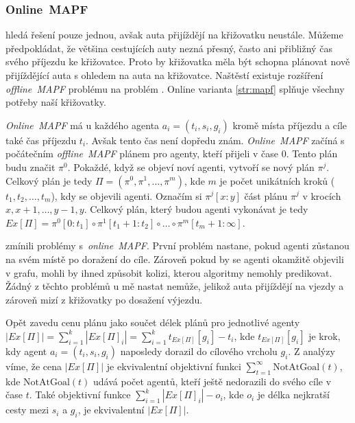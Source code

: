 \subsubsection{Online~MAPF}\label{subsubsec:online_mapf}

%

 hledá řešení pouze jednou, avšak auta přijíždějí na křižovatku neustále.
Můžeme předpokládat, že většina cestujících auty nezná přesný, často ani přibližný čas svého příjezdu ke křižovatce.
Proto by křižovatka měla být schopna plánovat nově přijíždějící auta s ohledem na auta na křižovatce.
Naštěstí existuje rozšíření \emph{offline~MAPF} problému na problém  \citet*{Svancara}.
Online varianta \ref{str:mapf} splňuje všechny potřeby naší křižovatky.

\emph{Online~MAPF} má u každého agenta $a_i = (t_i, s_i, g_i)$ kromě místa příjezdu a cíle také čas příjezdu $t_i$.
Avšak tento čas není dopředu znám.
\emph{Online~MAPF} začíná s počátečním \emph{offline~MAPF} plánem pro agenty, kteří přijeli v čase $0$.
Tento plán budu značit $\pi^0$.
Pokaždé, když se objeví noví agenti, vytvoří se nový plán $\pi^j$.
Celkový plán je tedy $\Pi = (\pi^0, \pi^1, \dots, \pi^m)$, kde $m$ je počet unikátních kroků ($t_1, t_2, \dots, t_m$), kdy se objevili agenti.
Označím si $\pi^j[x:y]$ část plánu $\pi^j$ v krocích $x, x + 1, \dots, y - 1, y$.
Celkový plán, který budou agenti vykonávat je tedy $Ex[\Pi] = \pi^0[0:t_1] \circ \pi^1[t_1 + 1:t_2] \circ \dots \circ \pi^m[t_m + 1:\infty]$.

\citet{Svancara} zmínili problémy s~\emph{online~MAPF}.
První problém nastane, pokud agenti zůstanou na svém místě po doražení do cíle.
Zároveň pokud by se agenti okamžitě objevili v grafu, mohli by ihned způsobit kolizi, kterou algoritmy nemohly predikovat.
Žádný z těchto problémů u mě nastat nemůže, jelikož auta přijíždějí na vjezdy
a zároveň mizí z křižovatky po dosažení výjezdu.

Opět zavedu cenu plánu jako součet délek plánů pro jednotlivé agenty $|Ex[\Pi]| = \sum_{i=1}^{k} |Ex[\Pi]_i| = \sum_{i=1}^{k} t_{Ex[\Pi]}[g_i] - t_i$,
kde $t_{Ex[\Pi]}[g_i]$ je krok, kdy agent $a_i = (t_i, s_i, g_i)$ naposledy dorazil do cílového vrcholu $g_i$.
Z analýzy \citet{Svancara} víme, že cena $|Ex[\Pi]|$ je ekvivalentní objektivní funkci $\sum_{t=1}^{\infty} \textrm{NotAtGoal}(t)$,
kde $\textrm{NotAtGoal}(t)$ udává počet agentů, kteří ještě nedorazili do svého cíle v čase $t$.
Také objektivní funkce $\sum_{i=1}^{k} |Ex[\Pi]_i| - o_i$, kde $o_i$ je délka nejkratší cesty mezi $s_i$ a $g_i$,
je ekvivalentní $|Ex[\Pi]|$.

